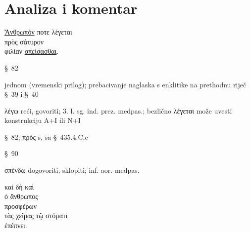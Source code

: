 \section*{Analiza i komentar}



{\large
\begin{greek}
\noindent \underline{Ἄνθρωπόν} ποτε λέγεται \\
\tabto{2em} πρὸς σάτυρον \\
φιλίαν \underline{σπείσασθαι}.\\

\end{greek}
}

\begin{description}[noitemsep]
\item[Ἄνθρωπόν] §~82
\item[ποτε] jednom (vremenski prilog); prebacivanje naglaska s enklitike na prethodnu riječ §~39 i §~40
\item[λέγεται] λέγω reći, govoriti; 3. l. sg. ind. prez. medpas.; bezlično λέγεται može uvesti konstrukciju A+I ili N+I
\item[πρὸς σάτυρον ] §~82; πρός s, sa §~435.4.C.c
\item[φιλίαν] §~90
\item[σπείσασθαι] σπένδω dogovoriti, sklopiti; inf. aor. medpas.

\end{description}

{\large
\begin{greek}
\noindent καὶ δὴ  καὶ  \\
ὁ ἄνθρωπος \\
\tabto{2em} προσφέρων \\
\tabto{4em} τὰς χεῖρας τῷ στόματι \\
ἐπέπνει.\\

\end{greek}
}

